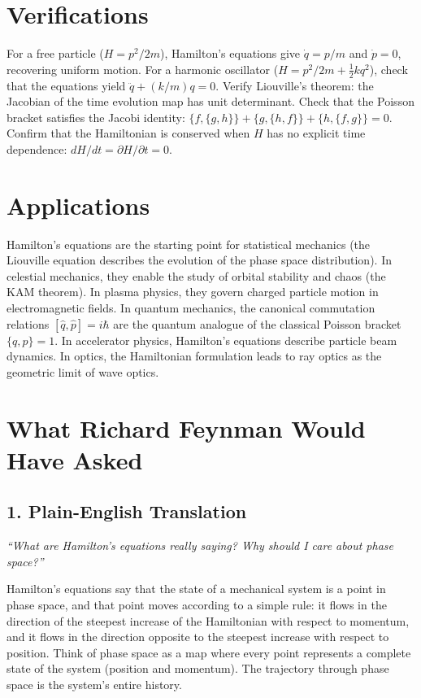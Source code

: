 \documentclass[11pt,openright]{book}
\begin{document}
\section*{Verifications}

For a free particle ($H = p^2/2m$), Hamilton's equations give $\dot{q} = p/m$ and $\dot{p} = 0$, recovering uniform motion. For a harmonic oscillator ($H = p^2/2m + \frac{1}{2}kq^2$), check that the equations yield $\ddot{q} + (k/m)q = 0$. Verify Liouville's theorem: the Jacobian of the time evolution map has unit determinant. Check that the Poisson bracket satisfies the Jacobi identity: $\{f, \{g, h\}\} + \{g, \{h, f\}\} + \{h, \{f, g\}\} = 0$. Confirm that the Hamiltonian is conserved when $H$ has no explicit time dependence: $dH/dt = \partial H/\partial t = 0$.
\section*{Applications}

Hamilton's equations are the starting point for statistical mechanics (the Liouville equation describes the evolution of the phase space distribution). In celestial mechanics, they enable the study of orbital stability and chaos (the KAM theorem). In plasma physics, they govern charged particle motion in electromagnetic fields. In quantum mechanics, the canonical commutation relations $[\hat{q}, \hat{p}] = i\hbar$ are the quantum analogue of the classical Poisson bracket $\{q, p\} = 1$. In accelerator physics, Hamilton's equations describe particle beam dynamics. In optics, the Hamiltonian formulation leads to ray optics as the geometric limit of wave optics.
\section*{What Richard Feynman Would Have Asked}

\subsection*{1. Plain-English Translation}
\textit{``What are Hamilton's equations really saying? Why should I care about phase space?''}

Hamilton's equations say that the state of a mechanical system is a point in phase space, and that point moves according to a simple rule: it flows in the direction of the steepest increase of the Hamiltonian with respect to momentum, and it flows in the direction opposite to the steepest increase with respect to position. Think of phase space as a map where every point represents a complete state of the system (position and momentum). The trajectory through phase space is the system's entire history.
\end{document}
